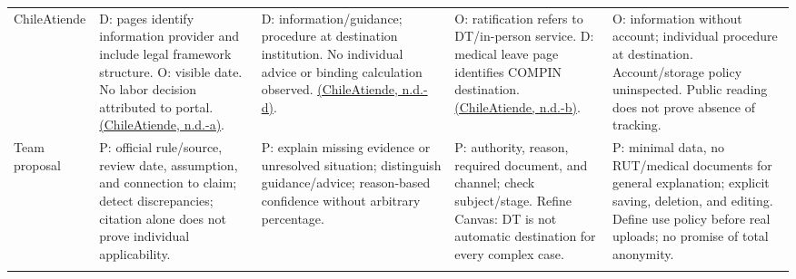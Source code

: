 \begin{landscape}
\begin{singlespace}
\begin{xltabular}{\linewidth}{@{}p{1.02in}YYYY@{}}
ChileAtiende & D: pages identify information provider and include legal framework structure. O: visible date. No labor decision attributed to portal. \hyperref[ref:ca_ayuda]{(ChileAtiende, n.d.-a)}. & D: information/guidance; procedure at destination institution. No individual advice or binding calculation observed. \hyperref[ref:ca_descripcion]{(ChileAtiende, n.d.-d)}. & O: ratification refers to DT/in-person service. D: medical leave page identifies COMPIN destination. \hyperref[ref:ca_licencias]{(ChileAtiende, n.d.-b)}. & O: information without account; individual procedure at destination. Account/storage policy uninspected. Public reading does not prove absence of tracking.\\\addlinespace[3pt]

Team proposal & P: official rule/source, review date, assumption, and connection to claim; detect discrepancies; citation alone does not prove individual applicability. & P: explain missing evidence or unresolved situation; distinguish guidance/advice; reason-based confidence without arbitrary percentage. & P: authority, reason, required document, and channel; check subject/stage. Refine Canvas: DT is not automatic destination for every complex case. & P: minimal data, no RUT/medical documents for general explanation; explicit saving, deletion, and editing. Define use policy before real uploads; no promise of total anonymity.\\\addlinespace[3pt]

\end{xltabular}\end{singlespace}\end{landscape}
